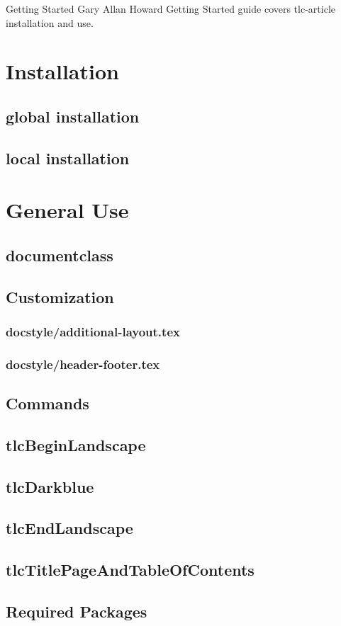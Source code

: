 \documentclass{tlc-article}
\begin{document}
  \tlcTitlePageAndTableOfContents
    {Getting Started}
    {Gary Allan Howard}
    {Getting Started guide covers tlc-article installation and use.}

\section{Installation}
\subsection{global installation}
\subsection{local installation}


\section{General Use}
\subsection{documentclass}

\subsection{Customization}
\subsubsection{docstyle/additional-layout.tex}
\subsubsection{docstyle/header-footer.tex}

\subsection{Commands}
\subsection{tlcBeginLandscape}
\subsection{tlcDarkblue}
\subsection{tlcEndLandscape}
\subsection{tlcTitlePageAndTableOfContents}

\subsection{Required Packages}
\end{document}
